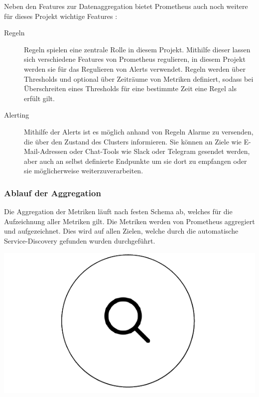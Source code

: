 \documentclass[a4paper,10pt]{scrartcl}
\begin{document}
Neben den Features zur Datenaggregation bietet Prometheus auch noch weitere für dieses Projekt wichtige Features :
\begin{description}
\item[Regeln]
Regeln spielen eine zentrale Rolle in diesem Projekt. Mithilfe dieser lassen sich verschiedene Features von Prometheus regulieren, in diesem Projekt werden sie für das Regulieren von Alerts verwendet.
Regeln werden über Thresholds und optional über Zeiträume von Metriken definiert, sodass bei Überschreiten eines Thresholds für eine bestimmte Zeit eine Regel als erfült gilt.
\item[Alerting]
Mithilfe der Alerts ist es möglich anhand von Regeln Alarme zu versenden, die über den Zustand des Clusters informieren. Sie können an Ziele wie E-Mail-Adressen oder Chat-Tools wie Slack oder Telegram gesendet werden, aber auch  an selbst definierte Endpunkte um sie dort zu empfangen oder sie möglicherweise weiterzuverarbeiten.

\end{description}

\subsubsection{Ablauf der Aggregation}

Die Aggregation der Metriken läuft nach festen Schema ab, welches für die Aufzeichnung aller Metriken gilt.
Die Metriken werden von Prometheus aggregiert und aufgezeichnet. Dies wird auf allen Zielen, welche durch die automatische Service-Discovery gefunden wurden durchgeführt.\\
\begin{minipage}{\linewidth}
  \includegraphics[scale=.3]{img/Datenaggregation/LupeNew.png} 
\end{minipage} 
\end{document}
